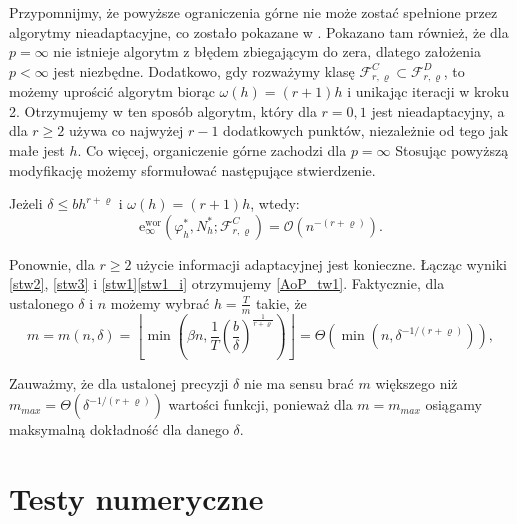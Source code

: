 \documentclass[oik, pdftex, robocza, man]{mgrwms}
\begin{document}
    Przypomnijmy, że powyższe ograniczenia górne nie może zostać spełnione przez algorytmy nieadaptacyjne, co zostało pokazane w \cite{PoA}. Pokazano tam również, że dla $p=\infty$ nie istnieje algorytm z błędem zbiegającym do zera, dlatego założenia $p < \infty$ jest niezbędne. Dodatkowo, gdy rozważymy klasę $\mathcal{F}_{r, \varrho}^{C} \subset \mathcal{F}_{r, \varrho}^{D}$, to możemy uprościć algorytm biorąc $\omega(h) = (r+1)h$ i unikając iteracji w kroku 2. Otrzymujemy w ten sposób algorytm, który dla $r=0,1$ jest nieadaptacyjny, a dla $r \geq 2$ używa co najwyżej $r-1$ dodatkowych punktów, niezależnie od tego jak małe jest $h$. Co więcej, organiczenie górne zachodzi dla $p = \infty$
    Stosując powyższą modyfikację możemy sformułować następujące stwierdzenie.

    \begin{stw}
        \label{stw3}
        Jeżeli $\delta \leq bh^{r+\varrho}$ i $\omega(h) = (r+1)h$, wtedy:
        \begin{equation}
            \mathrm{e}_{\infty}^{\mathrm{wor}}\left(\varphi_{h}^{*}, N_{h}^{*} ; \mathcal{F}_{r, \varrho}^{C}\right)=\mathcal{O}\left(n^{-(r+\varrho)}\right) .
        \end{equation}
    \end{stw}

    Ponownie, dla $r \geq 2$ użycie informacji adaptacyjnej jest konieczne. Łącząc wyniki \ref{stw2}, \ref{stw3} i \ref{stw1}\ref{stw1_i} otrzymujemy \ref{AoP_tw1}.
    Faktycznie, dla ustalonego $\delta$ i $n$ możemy wybrać $h = \frac{T}{m}$ takie, że
    \begin{equation}
        m = m(n, \delta)=\left\lfloor\min \left(\beta n, \frac{1}{T}\left(\frac{b}{\delta}\right)^{\frac{1}{r+\varrho}}\right)\right\rfloor=\varTheta\left(\min \left(n, \delta^{-1 /(r+\varrho)}\right)\right),
    \end{equation}

    \begin{uw}
        Zauważmy, że dla ustalonej precyzji $\delta$ nie ma sensu brać $m$ większego niż $m_{max} = \varTheta(\delta^{-1 / (r+\varrho)})$ wartości funkcji, ponieważ dla $m = m_{max}$ osiągamy maksymalną dokładność dla danego $\delta$.
    \end{uw}

\mgrclosechapter


\chapter{Testy numeryczne}
\end{document}
